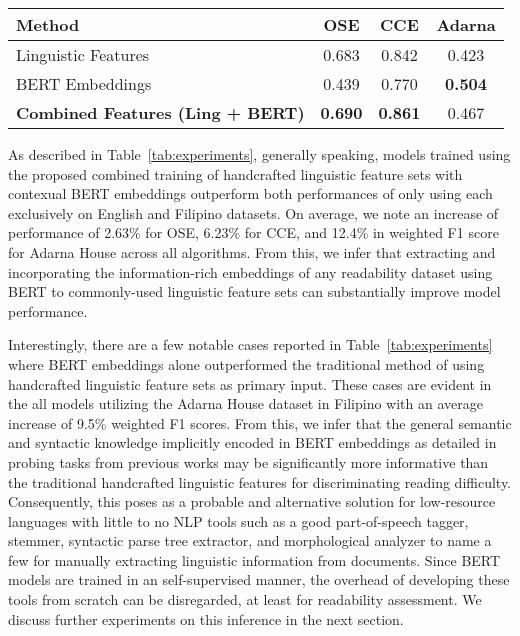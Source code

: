 \documentclass[11pt,a4paper]{article}
\begin{document}
\begin{table*}[!htbp]
\begin{subtable}[h]{\textwidth}
\begin{tabular}{|l|c|c|c|}
    \hline \bf Method & \bf OSE & \bf CCE &\bf  Adarna \\  \hline
    
    Linguistic Features                 & 0.683     & 0.842     & 0.423 \\ \hline
    BERT Embeddings                     & 0.439     & 0.770     & \bf 0.504 \\ \hline
    \bf Combined Features (Ling + BERT)    & \bf 0.690     & \bf 0.861     & 0.467 \\ \hline
    
    \end{tabular}
    \vspace{0.2 cm}
    \label{tab:rf}
    \end{subtable}

\caption{F1 performance via training with (a) Logistic Regression, (b) Support Vector Machines, and (c) Random Forest using handcrafted linguistic features, BERT sentence embeddings, and combined training of both.}
 \label{tab:experiments}
\end{table*}



As described in Table~\ref{tab:experiments}, generally speaking, models trained using the proposed combined training of handcrafted linguistic feature sets with contexual BERT embeddings outperform both performances of only using each exclusively on English and Filipino datasets. On average, we note an increase of performance of 2.63\% for OSE, 6.23\% for CCE, and 12.4\% in weighted F1 score for Adarna House across all algorithms. From this, we infer that extracting and incorporating the information-rich embeddings of any readability dataset using BERT to commonly-used linguistic feature sets can substantially improve model performance. 

Interestingly, there are a few notable cases reported in Table~\ref{tab:experiments} where BERT embeddings alone outperformed the traditional method of using handcrafted linguistic feature sets as primary input. These cases are evident in the all models utilizing the Adarna House dataset in Filipino with an average increase of 9.5\% weighted F1 scores. From this, we infer that the general semantic and syntactic knowledge implicitly encoded in BERT embeddings as detailed in probing tasks from previous works \cite{rogers-etal-2020-primer,hewitt-manning-2019-structural,liu-etal-2019-linguistic,tenney2019} may be significantly more informative than the traditional handcrafted linguistic features for discriminating reading difficulty. Consequently, this poses as a probable and alternative solution for low-resource languages with little to no NLP tools such as a good part-of-speech tagger, stemmer, syntactic parse tree extractor, and morphological analyzer to name a few for manually extracting linguistic information from documents. Since BERT models are trained in an self-supervised manner, the overhead of developing these tools from scratch can be disregarded, at least for readability assessment. We discuss further experiments on this inference in the next section.
\end{document}
